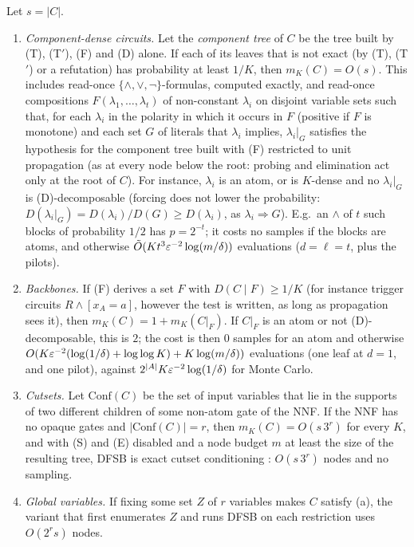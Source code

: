 \begin{corollary}\label{cor:dfsb}
Let $s=|C|$.
\begin{enumerate}[label=(\alph*)]
\item \emph{Component-dense circuits.} Let the \emph{component tree} of $C$ be the
tree built by (T), (T$'$), (F) and (D) alone. If each of its leaves that is not
exact (by (T), (T$'$) or a refutation) has probability at least $1/K$, then $m_K(C)=O(s)$. This
includes read-once $\{\wedge,\vee,\neg\}$-formulas, computed exactly, and read-once
compositions $F(\lambda_1,\dots,\lambda_t)$ of non-constant $\lambda_i$ on disjoint
variable sets such that, for each $\lambda_i$ in the polarity in which it occurs in
$F$ (positive if $F$ is monotone) and each set $G$ of literals that $\lambda_i$
implies, $\lambda_i|_G$ satisfies the hypothesis for the component tree built with
(F) restricted to unit propagation (as at every node below the root: probing and
elimination act only at the root of $C$). For instance, $\lambda_i$ is an atom, or is
$K$-dense and no $\lambda_i|_G$ is (D)-decomposable (forcing does not lower the
probability: $D(\lambda_i|_G)=D(\lambda_i)/D(G)\ge D(\lambda_i)$, as
$\lambda_i\Rightarrow G$). E.g.\ an
$\wedge$ of $t$ such blocks of probability $1/2$ has $p=2^{-t}$; it costs no samples
if the blocks are atoms, and otherwise $\tilde O(Kt^3\varepsilon^{-2}\log(m/\delta))$
evaluations ($d=\ell=t$, plus the pilots).
\item \emph{Backbones.} If (F) derives a set $F$ with $D(C\mid F)\ge1/K$ (for
instance trigger circuits $R\wedge[x_A=a]$, however the test is written, as long
as propagation sees it), then $m_K(C)=1+m_K(C|_F)$. If $C|_F$ is an atom or not
(D)-decomposable, this is $2$; the cost is then $0$ samples for an atom and otherwise
$O(K\varepsilon^{-2}(\log(1/\delta)+\log\log K)+K\log(m/\delta))$ evaluations (one leaf at
$d=1$, and one pilot), against $2^{|A|}K\varepsilon^{-2}\log(1/\delta)$ for Monte Carlo.
\item \emph{Cutsets.} Let $\mathrm{Conf}(C)$ be the set of input variables that lie
in the supports of two different children of some non-atom gate of the NNF. If
the NNF has no opaque gates and $|\mathrm{Conf}(C)|=r$, then $m_K(C)=O(s\,3^r)$ for
every $K$, and with (S) and (E) disabled and a node budget $m$ at least the size of the
resulting tree, DFSB is exact cutset conditioning \cite{pearl1988}: $O(s\,3^r)$ nodes
and no sampling.
\item \emph{Global variables.} If fixing some set $Z$ of $r$ variables makes $C$
satisfy (a), the variant that first enumerates $Z$ and runs DFSB on each restriction
uses $O(2^rs)$ nodes.
\end{enumerate}
\end{corollary}

